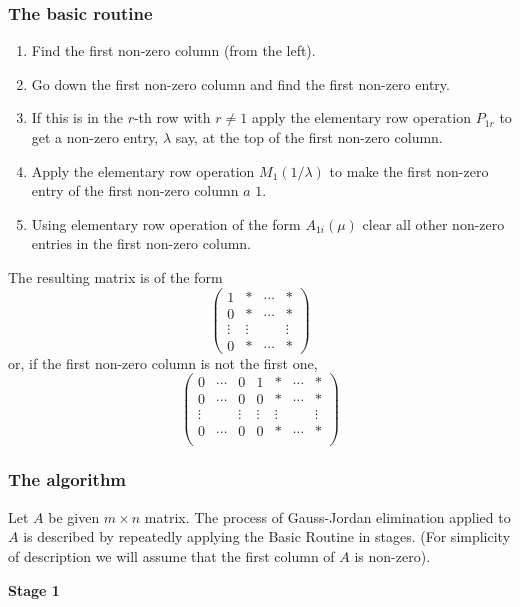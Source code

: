 \documentclass[10pt, a4paper]{article}
\begin{document}
\subsubsection{The basic routine}
\begin{enumerate}[label = (\alph*)]
    \item Find the first non-zero column (from the left).
    \item Go down the first non-zero column and find the first non-zero entry.
    \item If this is in the $r$-th row with $r \neq 1$ apply the elementary row operation $P_{1 r}$ to get a non-zero entry, $\lambda$ say, at the top of the first non-zero column.
    \item Apply the elementary row operation $M_1(1 / \lambda)$ to make the first non-zero entry of the first non-zero column $a$ $1$.
    \item Using elementary row operation of the form $A_{1 i}(\mu)$ clear all other non-zero entries in the first non-zero column.
\end{enumerate}

The resulting matrix is of the form
\[
\begin{pmatrix}
    1 & * & \dotsi & * \\
    0 & * & \dotsi & * \\
    \vdots & \vdots & \phantom{} & \vdots \\
    0 & * & \dotsi & *
\end{pmatrix}
\]
or, if the first non-zero column is not the first one,
\[
\begin{pmatrix}
    0 & \dotsi & 0 & 1 & * & \dotsi & * \\
    0 & \dotsi & 0 & 0 & * & \dotsi & * \\
    \vdots & \phantom{} & \vdots & \vdots & \vdots & \phantom{} & \vdots \\
    0 & \dotsi & 0 & 0 & * & \dotsi & * \\
\end{pmatrix}
\]

\subsubsection{The algorithm}
Let $A$ be given $m \times n$ matrix.
The process of Gauss-Jordan elimination applied to $A$ is described by repeatedly applying the Basic Routine in stages.
(For simplicity of description we will assume that the first column of $A$ is non-zero).

\textbf{Stage 1}
\end{document}

